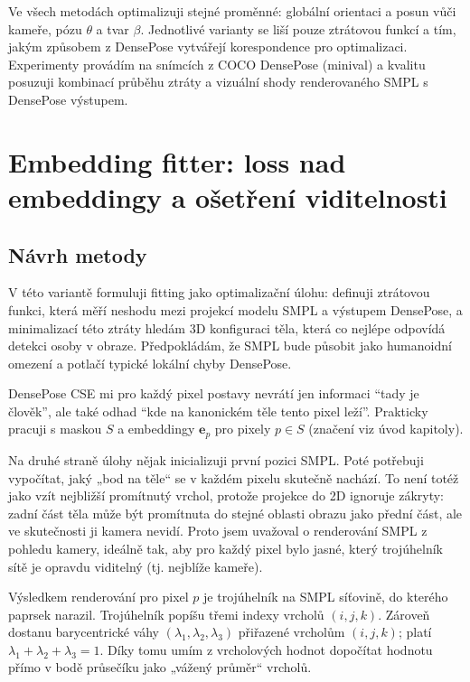 \documentclass[11pt,a4paper,twoside,openright]{report}
\begin{document}
Ve všech metodách optimalizuji stejné proměnné: globální orientaci a posun vůči kameře, pózu $\theta$ a tvar $\beta$. Jednotlivé varianty se liší pouze ztrátovou funkcí a tím, jakým způsobem z DensePose vytvářejí korespondence pro optimalizaci. Experimenty provádím na snímcích z COCO DensePose (minival) \cite{lin2014microsoft,guler2018densepose} a kvalitu posuzuji kombinací průběhu ztráty a vizuální shody renderovaného SMPL s DensePose výstupem.

\section{Embedding fitter: loss nad embeddingy a ošetření viditelnosti}

\subsection{Návrh metody}

V této variantě formuluji fitting jako optimalizační úlohu: definuji ztrátovou funkci, která měří neshodu mezi projekcí modelu SMPL a výstupem DensePose, a minimalizací této ztráty hledám 3D konfiguraci těla, která co nejlépe odpovídá detekci osoby v obraze. Předpokládám, že SMPL bude působit jako humanoidní omezení a potlačí typické lokální chyby DensePose.

DensePose CSE mi pro každý pixel postavy nevrátí jen informaci \enquote{tady je člověk}, ale také odhad \enquote{kde na kanonickém těle tento pixel leží}. Prakticky pracuji s maskou $S$ a embeddingy $\mathbf{e}_p$ pro pixely $p \in S$ (značení viz úvod kapitoly).

Na druhé straně úlohy nějak inicializuji první pozici SMPL. Poté potřebuji vypočítat, jaký „bod na těle“ se v každém pixelu skutečně nachází. To není totéž jako vzít nejbližší promítnutý vrchol, protože projekce do 2D ignoruje zákryty: zadní část těla může být promítnuta do stejné oblasti obrazu jako přední část, ale ve skutečnosti ji kamera nevidí. Proto jsem uvažoval o renderování SMPL z pohledu kamery, ideálně tak, aby pro každý pixel bylo jasné, který trojúhelník sítě je opravdu viditelný (tj. nejblíže kameře).

Výsledkem renderování pro pixel $p$ je trojúhelník na SMPL síťovině, do kterého paprsek narazil. Trojúhelník popíšu třemi indexy vrcholů $(i, j, k)$. Zároveň dostanu barycentrické váhy $(\lambda_1, \lambda_2, \lambda_3)$ přiřazené vrcholům $(i, j, k)$; platí $\lambda_1 + \lambda_2 + \lambda_3 = 1$. Díky tomu umím z vrcholových hodnot dopočítat hodnotu přímo v bodě průsečíku jako „vážený průměr“ vrcholů.
\end{document}
